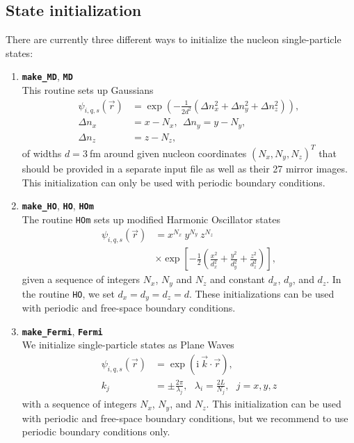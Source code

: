 \documentclass[4p]{elsarticle}
\begin{document}
\subsection{State initialization}
There are currently three different ways to initialize the nucleon single-particle states: 
\begin{enumerate}
	\item \textbf{\texttt{make\_MD}}, \textbf{\texttt{MD}}\\
	This routine sets up Gaussians  
	\begin{align}
	\psi_{i,q,s} (\vec{r}) &= \exp{\left(- \frac{1}{2 d^2} \left( \Delta n_x^2 + \Delta n_y^2 + \Delta n_z^2\right) \right)}, \\
	\Delta n_x &= x - N_x, \:\: \Delta n_y = y - N_y, \nonumber\\ 
	\Delta n_z &= z - N_z,  
	\end{align}
	of widths $d = 3\:$fm around given nucleon coordinates $(N_x, N_y, N_z)^T$ that should be provided in a separate input file as well as their 27 mirror images. This initialization can only be used with periodic boundary conditions. 
	\item  \textbf{\texttt{make\_HO}}, \textbf{\texttt{HO}}, \textbf{\texttt{HOm}}\\
	The routine \texttt{HOm} sets up modified Harmonic Oscillator states
	\begin{align}
	\psi_{i,q,s} (\vec{r}) &= x^{N_x} \: y^{N_y} \: z^{N_z} \nonumber\\
	 & \times \exp{\left[- \frac{1}{2} \left( \frac{x^2}{d_x^2} + \frac{y^2}{d_y^2} + \frac{z^2}{d_z^2} \right) \right]}, 
	\end{align}
	given a sequence of integers $N_x$, $N_y$ and $N_z$ and constant $d_x$, $d_y$, and $d_z$. In the routine \texttt{HO}, we set $d_x = d_y = d_z = d$. These initializations can be used with periodic and free-space boundary conditions.
	\item \textbf{\texttt{make\_Fermi}}, \textbf{\texttt{Fermi}}\\
	We initialize single-particle states as Plane Waves
	\begin{align}
	\psi_{i,q,s} (\vec{r}) &= \exp \left( \mathrm{i}  \: \vec{k} \cdot \vec{r} \right), \\ 
	k_j &= \pm \frac{2 \pi}{\lambda_j}, \:\:\: \lambda_i = \frac{2 L}{N_j}, \:\:\: j = x, y, z
	\end{align}
	with a sequence of integers $N_x$, $N_y$, and $N_z$. This initialization can be used with periodic and free-space boundary conditions, but we recommend to use periodic boundary conditions only.
\end{enumerate}
\end{document}
